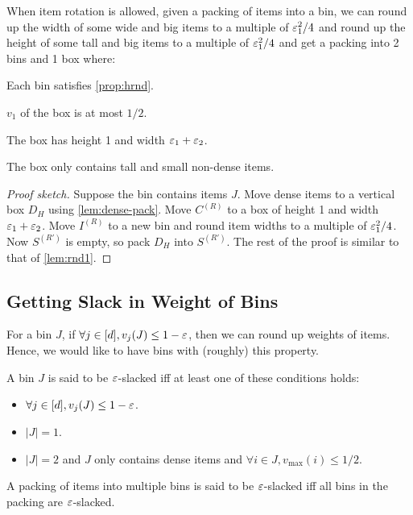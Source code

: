 \begin{lemma}
\label{lem:rnd1-rot}
When item rotation is allowed, given a packing of items into a bin, we can
round up the width of some wide and big items to a multiple of $\varepsilon_1^2/4$
and round up the height of some tall and big items to a multiple of $\varepsilon_1^2/4$
and get a packing into 2 bins and 1 box where:
\begin{tightemize}
\item Each bin satisfies \cref{prop:hrnd}.
\item $v_1$ of the box is at most $1/2$.
\item The box has height 1 and width $\varepsilon_1 + \varepsilon_2$.
\item The box only contains tall and small non-dense items.
\end{tightemize}
\end{lemma}
\begin{proof}[Proof sketch]
Suppose the bin contains items $J$. Move dense items to a vertical box $D_H$
using \cref{lem:dense-pack}.
Move $C^{(R)}$ to a box of height 1 and width $\varepsilon_1 + \varepsilon_2$.
Move $I^{(R)}$ to a new bin and round item widths to a multiple of $\varepsilon_1^2/4$.
Now $S^{(R')}$ is empty, so pack $D_H$ into $S^{(R')}$.
The rest of the proof is similar to that of \cref{lem:rnd1}.
\end{proof}

\subsection{Getting Slack in Weight of Bins}
\label{sec:gv-rbbp:slack}

For a bin $J$, if $\forall j \in [d], v_j(J) \le 1 - \varepsilon$,
then we can round up weights of items.
Hence, we would like to have bins with (roughly) this property.

\begin{definition}
A bin $J$ is said to be $\varepsilon$-slacked iff at least one of these conditions holds:
\begin{itemize}
\item $\forall j \in [d], v_j(J) \le 1-\varepsilon$.
\item $|J| = 1$.
\item $|J| = 2$ and $J$ only contains dense items and
$\forall i \in J, v_{\max}(i) \le 1/2$.
\end{itemize}
A packing of items into multiple bins is said to be $\varepsilon$-slacked
iff all bins in the packing are $\varepsilon$-slacked.
\end{definition}

